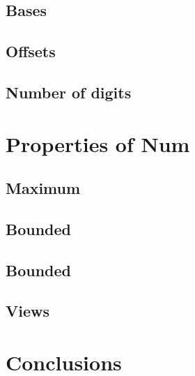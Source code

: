 \documentclass[12pt, a4paper]{article}
\begin{document}
%





\subsection{Bases}
\subsection{Offsets}
\subsection{Number of digits}

\section{Properties of Num}
\subsection{Maximum}
\subsection{Bounded}
\subsection{Bounded}
\subsection{Views}

\section{Conclusions}\label{conclusions}



\end{document}
